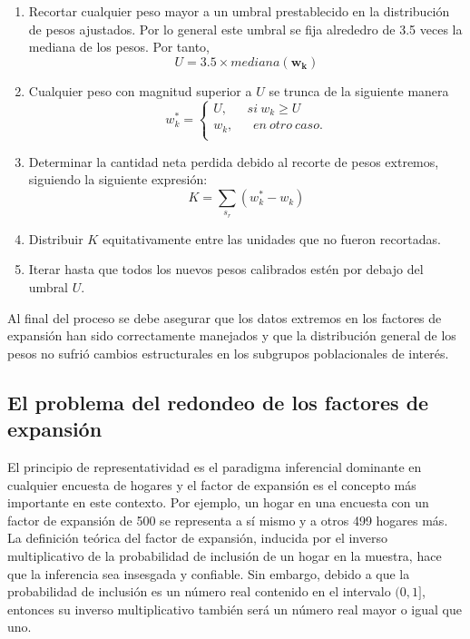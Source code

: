 \documentclass[
  12pt,
  spanish,
]{book}
\providecommand{\tightlist}{%
  \setlength{\itemsep}{0pt}\setlength{\parskip}{0pt}}
\begin{document}
\begin{enumerate}
\def\labelenumi{\arabic{enumi}.}
\tightlist
\item
  Recortar cualquier peso mayor a un umbral prestablecido en la distribución de pesos ajustados. Por lo general este umbral se fija alrededro de 3.5 veces la mediana de los pesos. Por tanto,
  \[
  U=3.5\times mediana(\mathbf{w_{k}})
  \]
\item
  Cualquier peso con magnitud superior a \(U\) se trunca de la siguiente manera
  \[
  w_k^\ast=\left\{\begin{matrix}U,\ \ \ \ \ \ \ si\ w_{k}\geq U\\
  w_{k},\ \ \ \ \ \ \ en\ otro\ caso.\\\end{matrix}\right.
  \]
\item
  Determinar la cantidad neta perdida debido al recorte de pesos extremos, siguiendo la siguiente expresión:
  \[
  K=\sum_{s_r}(w_k^\ast - w_{k})
  \]
\item
  Distribuir \(K\) equitativamente entre las unidades que no fueron recortadas.
\item
  Iterar hasta que todos los nuevos pesos calibrados estén por debajo del umbral \(U\).
\end{enumerate}

Al final del proceso se debe asegurar que los datos extremos en los factores de expansión han sido correctamente manejados y que la distribución general de los pesos no sufrió cambios estructurales en los subgrupos poblacionales de interés.

\hypertarget{el-problema-del-redondeo-de-los-factores-de-expansiuxf3n}{%
\subsection*{El problema del redondeo de los factores de expansión}\label{el-problema-del-redondeo-de-los-factores-de-expansiuxf3n}}

El principio de representatividad es el paradigma inferencial dominante en cualquier encuesta de hogares y el factor de expansión es el concepto más importante en este contexto. Por ejemplo, un hogar en una encuesta con un factor de expansión de 500 se representa a sí mismo y a otros 499 hogares más. La definición teórica del factor de expansión, inducida por el inverso multiplicativo de la probabilidad de inclusión de un hogar en la muestra, hace que la inferencia sea insesgada y confiable. Sin embargo, debido a que la probabilidad de inclusión es un número real contenido en el intervalo \((0, 1]\), entonces su inverso multiplicativo también será un número real mayor o igual que uno.
\end{document}

